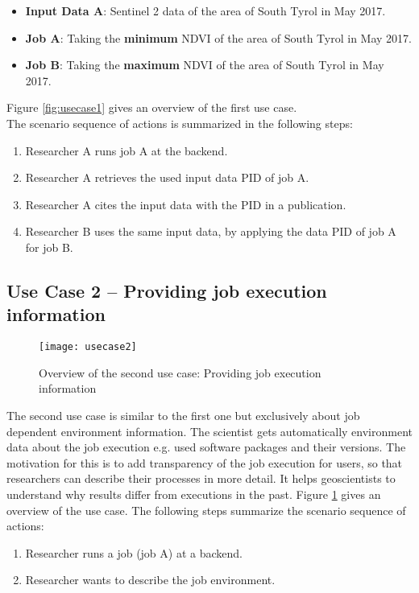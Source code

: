 \documentclass[draft,final]{vutinfth} %
\begin{document}
\begin{itemize}
	\item \textbf{Input Data A}: Sentinel 2 data of the area of South Tyrol in May 2017. 
	\item \textbf{Job A}: Taking the \textbf{minimum} NDVI of the area of South Tyrol in May 2017. 
	\item \textbf{Job B}: Taking the \textbf{maximum} NDVI of the area of South Tyrol in May 2017.
\end{itemize}

Figure \ref{fig:usecase1} gives an overview of the first use case. \\

The scenario sequence of actions is summarized in the following steps: \\

\begin{enumerate}
	\item Researcher A runs job A at the backend.
	\item Researcher A retrieves the used input data PID of job A.
	\item Researcher A cites the input data with the PID in a publication.
	\item Researcher B uses the same input data, by applying the data PID of job A for job B.  
\end{enumerate}

\subsection{Use Case 2 – Providing job execution information}\label{UseCase2}
\begin{figure}[h]
	\centering
	\texttt{[image: usecase2]}
	\caption{Overview of the second use case: Providing job execution information}
	\label{fig:usecase2} %
\end{figure}

The second use case is similar to the first one but exclusively about job dependent environment information. The scientist gets automatically environment data about the job execution e.g. used software packages and their versions. The motivation for this is to add transparency of the job execution for users, so that researchers can describe their processes in more detail. It helps geoscientists to understand why results differ from executions in the past. Figure \ref{fig:usecase2} gives an overview of the use case. 
The following steps summarize the scenario sequence of actions: \\
\begin{enumerate}
	\item Researcher runs a job (job A) at a backend.
	\item Researcher wants to describe the job environment.
\end{enumerate}
\end{document}
